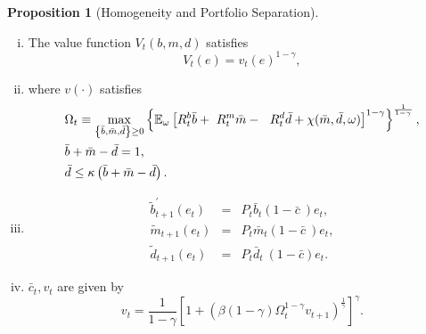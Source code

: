 \documentclass[10pt]{beamer}
\def\widehrulefill{\leaders\hrule height 0.35pt\hfill}
\newtheorem{proposition}[theorem]{Proposition}
\begin{document}
 \linespread{1.}
\begin{frame}[shrink=0.04]

\begin{proposition}[Homogeneity and Portfolio Separation]
\end{proposition}
\begin{enumerate}[(i)]
\item The value function $V_t(b,m,d)$ satisfies \label{Pp_Homogeneity}%
\begin{equation*}
V_{t}(e)=v_{t}\left( e\right) ^{1-\gamma },  \label{V}
\end{equation*}

\item where $v\left( \cdot \right) $ satisfies
\begin{align*}
& \Omega _{t}\equiv \max_{\left\{ \bar{b},\bar{m},\bar{d}\right\} \geq
0}\left\{ \mathbb{E}_{\omega }\left[ R_{t}^{b}\bar{b}+\ R_{t}^{m}\bar{m}-\ \
R_{t}^{d}\bar{d}+\chi (\bar{m},\bar{d},\omega )\right] ^{1-\gamma }\right\}
^{\frac{1}{^{1-\gamma }}}, \notag \\
& \bar{b}+\bar{m}-\bar{d}=1,  \notag \\
& \bar{d}\leq \kappa \left( \bar{b}+\bar{m}-\bar{d}\right) .  \notag
\end{align*}

 \item
 \begin{eqnarray*}
\tilde{b}_{t+1}^{\prime }(e_{t}) &=&P_{t}\bar{b}_{t}(1-\bar{c}\ )e_{t}, \\
\tilde{m}_{t+1}(e_{t}) &=&P_{t}\bar{m}_{t}(1-\bar{c}\ )e_{t}, \\
\tilde{d}_{t+1}(e_{t}) &=&P_{t}\bar{d}_{t}\ (1-\bar{c})e_{t}.
\end{eqnarray*}

\item $\bar{c}_{t},v_t$ are given by
\begin{equation*}
v_{t}=\frac{1}{1-\gamma }\left[ 1+\left( \beta (1-\gamma )\Omega
_{t}^{1-\gamma }v_{t+1}\right) ^{\frac{1}{\gamma }}\right] ^{\gamma }.
\end{equation*}


\end{enumerate}
\end{frame}
\end{document}
